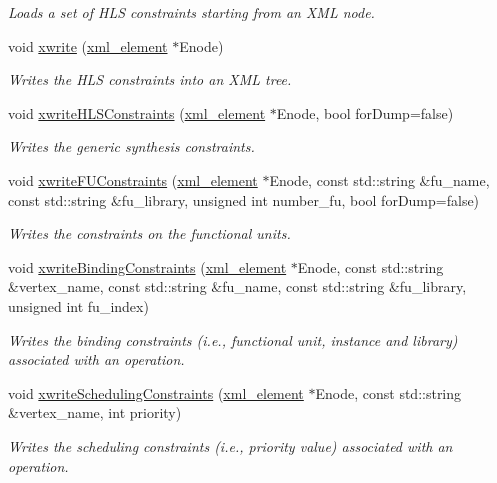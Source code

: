 \begin{DoxyCompactItemize}
\begin{DoxyCompactList}\small\item\em Loads a set of H\+LS constraints starting from an X\+ML node. \end{DoxyCompactList}\item 
void \hyperlink{classHLS__constraints_ab4c4cb541597b8ac5e28b4309ea1af4b}{xwrite} (\hyperlink{classxml__element}{xml\+\_\+element} $\ast$Enode)
\begin{DoxyCompactList}\small\item\em Writes the H\+LS constraints into an X\+ML tree. \end{DoxyCompactList}\item 
void \hyperlink{classHLS__constraints_af924912aeb49636faa808c66697bd1cb}{xwrite\+H\+L\+S\+Constraints} (\hyperlink{classxml__element}{xml\+\_\+element} $\ast$Enode, bool for\+Dump=false)
\begin{DoxyCompactList}\small\item\em Writes the generic synthesis constraints. \end{DoxyCompactList}\item 
void \hyperlink{classHLS__constraints_ace5701a60c9f6c9a1b46c3b7681863c3}{xwrite\+F\+U\+Constraints} (\hyperlink{classxml__element}{xml\+\_\+element} $\ast$Enode, const std\+::string \&fu\+\_\+name, const std\+::string \&fu\+\_\+library, unsigned int number\+\_\+fu, bool for\+Dump=false)
\begin{DoxyCompactList}\small\item\em Writes the constraints on the functional units. \end{DoxyCompactList}\item 
void \hyperlink{classHLS__constraints_af671c4e42c7fd6dece76dfcb53ce627a}{xwrite\+Binding\+Constraints} (\hyperlink{classxml__element}{xml\+\_\+element} $\ast$Enode, const std\+::string \&vertex\+\_\+name, const std\+::string \&fu\+\_\+name, const std\+::string \&fu\+\_\+library, unsigned int fu\+\_\+index)
\begin{DoxyCompactList}\small\item\em Writes the binding constraints (i.\+e., functional unit, instance and library) associated with an operation. \end{DoxyCompactList}\item 
void \hyperlink{classHLS__constraints_a863dabf331d4e0642f829e25ded9b6b5}{xwrite\+Scheduling\+Constraints} (\hyperlink{classxml__element}{xml\+\_\+element} $\ast$Enode, const std\+::string \&vertex\+\_\+name, int priority)
\begin{DoxyCompactList}\small\item\em Writes the scheduling constraints (i.\+e., priority value) associated with an operation. \end{DoxyCompactList}\item 

\end{DoxyCompactItemize}

